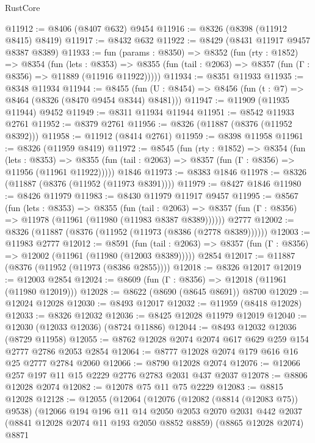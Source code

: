 \begin{lexlean}{RustCore}
\begin{coremodule}
@11912 := @8406 (@8407 @632) @9454
@11916 := @8326 (@8398 (@11912 @8415) @8419)
@11917 := @8432 @632
@11922 := @8429 (@8431 @11917 @9457 @8387 @8389)
@11933 := fun (params : @8350) =>
  @8352
    (fun (rty : @1852) =>
    @8354
      (fun (lets : @8353) =>
      @8355 (fun (tail : @2063) => @8357 (fun (Γ : @8356) => @11889 (@11916 @11922)))))
@11934 := @8351 @11933
@11935 := @8348 @11934
@11944 := @8455 (fun (U : @8454) => @8456 (fun (t : @7) => @8464 (@8326 (@8470 @9454 @8344) @8481)))
@11947 := @11909 (@11935 @11944) @9452
@11949 := @8311 @11934 @11944
@11951 := @8542 @11933 @2761
@11952 := @8379 @2761
@11956 := @8326 (@11887 (@8376 (@11952 @8392)))
@11958 := @11912 (@8414 @2761)
@11959 := @8398 @11958
@11961 := @8326 (@11959 @8419)
@11972 := @8545
    (fun (rty : @1852) =>
    @8354
      (fun (lets : @8353) =>
      @8355 (fun (tail : @2063) => @8357 (fun (Γ : @8356) => @11956 (@11961 @11922)))))
    @1846
@11973 := @8383 @1846
@11978 := @8326 (@11887 (@8376 (@11952 (@11973 @8391))))
@11979 := @8427 @1846
@11980 := @8426 @11979
@11983 := @8430 @11979 @11917 @9457
@11995 := @8567
    (fun (lets : @8353) =>
    @8355
      (fun (tail : @2063) =>
      @8357 (fun (Γ : @8356) => @11978 (@11961 (@11980 (@11983 @8387 @8389))))))
    @2777
@12002 := @8326 (@11887 (@8376 (@11952 (@11973 (@8386 (@2778 @8389))))))
@12003 := @11983 @2777
@12012 := @8591
    (fun (tail : @2063) => @8357 (fun (Γ : @8356) => @12002 (@11961 (@11980 (@12003 @8389)))))
    @2854
@12017 := @11887 (@8376 (@11952 (@11973 (@8386 @2855))))
@12018 := @8326 @12017
@12019 := @12003 @2854
@12024 := @8609 (fun (Γ : @8356) => @12018 (@11961 (@11980 @12019)))
@12028 := @8622 (@8690 (@8645 @8691)) @8700
@12029 := @12024 @12028
@12030 := @8493 @12017
@12032 := @11959 (@8418 @12028)
@12033 := @8326 @12032
@12036 := @8425 @12028 @11979 @12019
@12040 := @12030 (@12033 @12036) (@8724 @11886)
@12044 := @8493 @12032 @12036 (@8729 @11958)
@12055 := @8762 @12028 @2074 @2074 @617 @629 @259 @154 @2777 @2786 @2053 @2854
@12064 := @8777 @12028 @2074 @179 @616 @16 @25 @2777 @2784 @2060
@12066 := @8790 @12028 @2074
@12076 := @12066 @257 @197 @11 @15 @2229 @2776 @2783 @2031 @437 @2037
@12078 := @8806 @12028 @2074
@12082 := @12078 @75 @11 @75 @2229
@12083 := @8815 @12028
@12128 := @12055
    (@12064
      (@12076
        (@12082 (@8814 (@12083 @75)) @9538)
        (@12066
          @194
          @196
          @11
          @14
          @2050
          @2053
          @2070
          @2031
          @442
          @2037
          (@8841 @12028 @2074 @11 @193 @2050 @8852 @8859)
          (@8865 @12028 @2074)
          @8871

\end{coremodule}
\end{lexlean}
